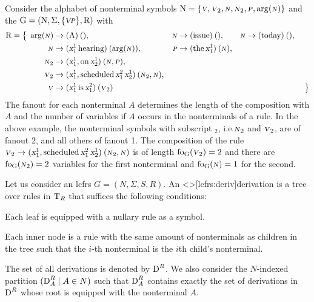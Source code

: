 \documentclass[../../document.tex]{subfiles}
\begin{document}
    \begin{example}\label{ex:lcfrs:rules}
        Consider the alphabet of nonterminal symbols \(\mathrm{N} = \{\textsc{\textsl{v}}, \textsc{\textsl{v}}_2, \textsc{\textsl{n}}, \textsc{\textsl{n}}_2, \textsc{\textsl{p}}, \arg(\textsc{\textsl{n}})\}\) and the  \(\mathrm{G} = (\mathrm{N}, \Sigma, \{\textsc{\textsl{vp}}\}, \mathrm{R})\) with
        \begin{align*}
            \mathrm{R} = \big\{\;
            \arg(\textsc{\textsl{n}}) &\to (\text{A})\:(), &\textsc{\textsl{n}} &\to (\text{issue})\:(), &\textsc{\textsl{n}} &\to (\text{today})\:(), &\\
            \textsc{\textsl{n}} &\to (\textsl{x}_1^1 \, \text{hearing})\:(\arg(\textsc{\textsl{n}})), &\textsc{\textsl{p}} &\to (\text{the}\,\textsl{x}_1^1)\:(\textsc{\textsl{n}}), \\
            \textsc{\textsl{n}}_2 &\to (\textsl{x}_1^1, \text{on} \, \textsl{x}_2^1)\:(\textsc{\textsl{n}}, \textsc{\textsl{p}}), \\
            \textsc{\textsl{v}}_2 &\to (\textsl{x}_1^1, \text{scheduled} \, \textsl{x}_1^2 \, \textsl{x}_2^1)\:(\textsc{\textsl{n}}_2, \textsc{\textsl{n}}), \\
            \textsc{\textsl{v}} &\to (\textsl{x}_1^1 \, \text{is} \, \textsl{x}_1^2)\:(\textsc{\textsl{v}}_2)
            &&&&&\;\big\}
        \end{align*}
        The fanout for each nonterminal \(A\) determines the length of the composition with  \(A\) and the number of variables if \(A\) occurs in the  nonterminals of a rule.
        In the above example, the nonterminal symbols with subscript \(_2\), i.e.\@ \(\textsc{\textsl{n}}_2\) and \(\textsc{\textsl{v}}_2\), are of fanout 2, and all others of fanout 1.
        The composition of the rule \(\textsc{\textsl{v}}_2 \to (\textsl{x}_1^1, \text{scheduled} \, \textsl{x}_1^2 \, \textsl{x}_2^1)\:(\textsc{\textsl{n}}_2, \textsc{\textsl{n}})\) is of length \(\operatorname{fo}_{\mathrm{G}}(\textsc{\textsl{v}}_2) = 2\) and there are \(\operatorname{fo}_{\mathrm{G}}(\textsc{\textsl{n}}_2) = 2\) variables for the first  nonterminal and \(\operatorname{fo}_{\mathrm{G}}(\textsc{\textsl{n}}) = 1\) for the second.
    \end{example}

    \begin{definition}[Derivation]
        Let us consider an lcfrs \(G = (N, \varSigma, S, R)\).
        An  <\lcfrs>[lcfrs:deriv]{derivation} is a tree over rules in \(\operatorname{T}_R\) that suffices the following conditions:
        \begin{compactitem}
            \item Each leaf is equipped with a nullary rule as a symbol.
            \item Each inner node is a rule with the same amount of  nonterminals as children in the tree such that the \(i\)-th  nonterminal is the \(i\)th child's  nonterminal.
        \end{compactitem}
        The set of all  derivations is denoted by \(\operatorname{D}^R\).
        We also consider the \(N\)-indexed partition \((\operatorname{D}^R_A \mid A \in N)\) such that \(\operatorname{D}^R_A\) contains exactly the set of derivations in \(\operatorname{D}^R\) whose root is equipped with the  nonterminal \(A\).
    \end{definition}
\end{document}
